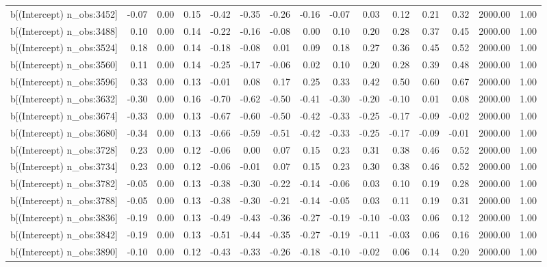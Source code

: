 \begin{table}[ht]
\begin{tabular}{rrrrrrrrrrrrrrr}
  b[(Intercept) n\_obs:3452] & -0.07 & 0.00 & 0.15 & -0.42 & -0.35 & -0.26 & -0.16 & -0.07 & 0.03 & 0.12 & 0.21 & 0.32 & 2000.00 & 1.00 \\ 
  b[(Intercept) n\_obs:3488] & 0.10 & 0.00 & 0.14 & -0.22 & -0.16 & -0.08 & 0.00 & 0.10 & 0.20 & 0.28 & 0.37 & 0.45 & 2000.00 & 1.00 \\ 
  b[(Intercept) n\_obs:3524] & 0.18 & 0.00 & 0.14 & -0.18 & -0.08 & 0.01 & 0.09 & 0.18 & 0.27 & 0.36 & 0.45 & 0.52 & 2000.00 & 1.00 \\ 
  b[(Intercept) n\_obs:3560] & 0.11 & 0.00 & 0.14 & -0.25 & -0.17 & -0.06 & 0.02 & 0.10 & 0.20 & 0.28 & 0.39 & 0.48 & 2000.00 & 1.00 \\ 
  b[(Intercept) n\_obs:3596] & 0.33 & 0.00 & 0.13 & -0.01 & 0.08 & 0.17 & 0.25 & 0.33 & 0.42 & 0.50 & 0.60 & 0.67 & 2000.00 & 1.00 \\ 
  b[(Intercept) n\_obs:3632] & -0.30 & 0.00 & 0.16 & -0.70 & -0.62 & -0.50 & -0.41 & -0.30 & -0.20 & -0.10 & 0.01 & 0.08 & 2000.00 & 1.00 \\ 
  b[(Intercept) n\_obs:3674] & -0.33 & 0.00 & 0.13 & -0.67 & -0.60 & -0.50 & -0.42 & -0.33 & -0.25 & -0.17 & -0.09 & -0.02 & 2000.00 & 1.00 \\ 
  b[(Intercept) n\_obs:3680] & -0.34 & 0.00 & 0.13 & -0.66 & -0.59 & -0.51 & -0.42 & -0.33 & -0.25 & -0.17 & -0.09 & -0.01 & 2000.00 & 1.00 \\ 
  b[(Intercept) n\_obs:3728] & 0.23 & 0.00 & 0.12 & -0.06 & 0.00 & 0.07 & 0.15 & 0.23 & 0.31 & 0.38 & 0.46 & 0.52 & 2000.00 & 1.00 \\ 
  b[(Intercept) n\_obs:3734] & 0.23 & 0.00 & 0.12 & -0.06 & -0.01 & 0.07 & 0.15 & 0.23 & 0.30 & 0.38 & 0.46 & 0.52 & 2000.00 & 1.00 \\ 
  b[(Intercept) n\_obs:3782] & -0.05 & 0.00 & 0.13 & -0.38 & -0.30 & -0.22 & -0.14 & -0.06 & 0.03 & 0.10 & 0.19 & 0.28 & 2000.00 & 1.00 \\ 
  b[(Intercept) n\_obs:3788] & -0.05 & 0.00 & 0.13 & -0.38 & -0.30 & -0.21 & -0.14 & -0.05 & 0.03 & 0.11 & 0.19 & 0.31 & 2000.00 & 1.00 \\ 
  b[(Intercept) n\_obs:3836] & -0.19 & 0.00 & 0.13 & -0.49 & -0.43 & -0.36 & -0.27 & -0.19 & -0.10 & -0.03 & 0.06 & 0.12 & 2000.00 & 1.00 \\ 
  b[(Intercept) n\_obs:3842] & -0.19 & 0.00 & 0.13 & -0.51 & -0.44 & -0.35 & -0.27 & -0.19 & -0.11 & -0.03 & 0.06 & 0.16 & 2000.00 & 1.00 \\ 
  b[(Intercept) n\_obs:3890] & -0.10 & 0.00 & 0.12 & -0.43 & -0.33 & -0.26 & -0.18 & -0.10 & -0.02 & 0.06 & 0.14 & 0.20 & 2000.00 & 1.00 \\ 

\end{tabular}
\end{table}
